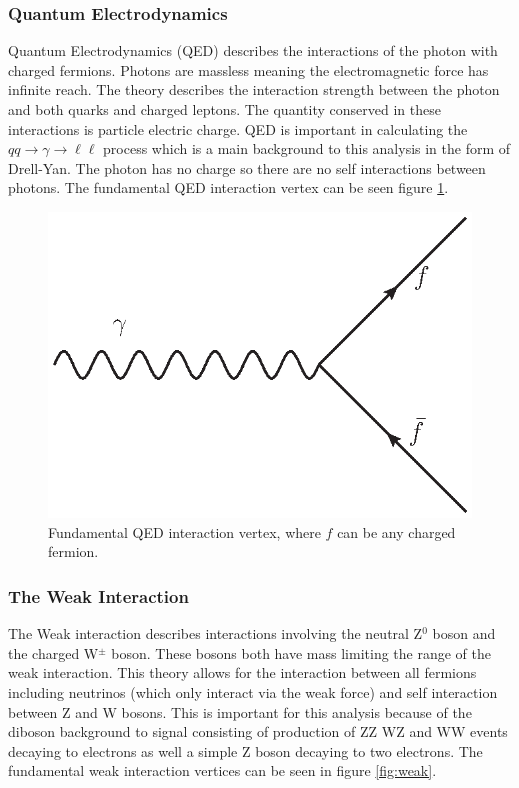     \subsubsection*{Quantum Electrodynamics}
    Quantum Electrodynamics (QED) describes the interactions of the photon with charged fermions. Photons are massless meaning the electromagnetic force has infinite reach. The theory describes the interaction strength between the photon and both quarks and charged leptons. The quantity conserved in these interactions is particle electric charge. QED is important in calculating the $qq \rightarrow\gamma\rightarrow\ell\ell$ process which is a main background to this analysis in the form of Drell-Yan. The photon has no charge so there are no self interactions between photons. The fundamental QED interaction vertex can be seen figure \ref{fig:QED}.

    \begin{figure}[h]
        \begin{center}
        \includegraphics[width=0.5\linewidth]{images/gamma_fermion.eps}
        \end{center}
        \caption{Fundamental QED interaction vertex, where $f$ can be any charged fermion.}
        \label{fig:QED}
    \end{figure}

    \subsubsection*{The Weak Interaction}
    The Weak interaction describes interactions involving the neutral Z$^{0}$ boson and the charged W$^{\pm}$ boson. These bosons both have mass limiting the range of the weak interaction. 
    This theory allows for the interaction between all fermions including neutrinos (which only interact via the weak force) and self interaction between Z and W bosons. This is important for this analysis because of the diboson background to signal consisting of production of ZZ WZ and WW events decaying to electrons as well a simple Z boson decaying to two electrons. The fundamental weak interaction vertices can be seen in figure \ref{fig:weak}.

